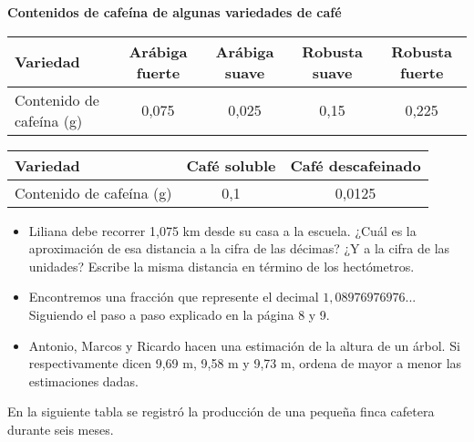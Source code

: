 \documentclass[12pt,a4paper]{article}
\begin{document}
\vspace{0.5cm}

\textbf{Contenidos de cafeína de algunas variedades de café}

\begin{center}
\small
\begin{tabular}{|l|c|c|c|c|}
\hline
\textbf{Variedad} & \textbf{Arábiga fuerte} & \textbf{Arábiga suave} & \textbf{Robusta suave} & \textbf{Robusta fuerte} \\
\hline
Contenido de cafeína (g) & 0,075 & 0,025 & 0,15 & 0,225 \\
\hline
\end{tabular}

\vspace{0.3cm}

\begin{tabular}{|l|c|c|}
\hline
\textbf{Variedad} & \textbf{Café soluble} & \textbf{Café descafeinado} \\
\hline
Contenido de cafeína (g) & 0,1 & 0,0125 \\
\hline
\end{tabular}
\normalsize
\end{center}

\vspace{0.5cm}

\begin{itemize}
\item Liliana debe recorrer 1,075 km desde su casa a la escuela. ¿Cuál es la aproximación de esa distancia a la cifra de las décimas? ¿Y a la cifra de las unidades? Escribe la misma distancia en término de los hectómetros.
\end{itemize}


\begin{itemize}
\item Encontremos una fracción que represente el decimal $1,08976976976...$ Siguiendo el paso a paso explicado en la página 8 y 9.

\item Antonio, Marcos y Ricardo hacen una estimación de la altura de un árbol. Si respectivamente dicen 9,69 m, 9,58 m y 9,73 m, ordena de mayor a menor las estimaciones dadas.
\end{itemize}

\vspace{1cm}

En la siguiente tabla se registró la producción de una pequeña finca cafetera durante seis meses.
\end{document}

